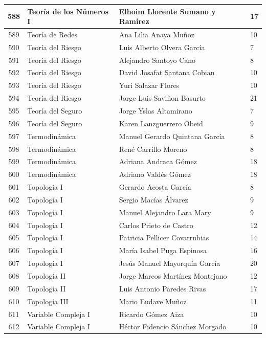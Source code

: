 {\begin{longtable}{|c|p{6.5cm}|p{5cm}|p{1.5cm}|}
  588 & Teoría de los Números I & Elhoim Llorente Sumano y Ramírez & 17 \\ \hline 
  589 & Teoría de Redes & Ana Lilia Anaya Muñoz & 10 \\ \hline 
  590 & Teoría del Riesgo & Luis Alberto Olvera García & 7 \\ \hline 
  591 & Teoría del Riesgo & Alejandro Santoyo Cano & 8 \\ \hline 
  592 & Teoría del Riesgo & David Josafat Santana Cobian & 10 \\ \hline 
  593 & Teoría del Riesgo & Yuri Salazar Flores & 10 \\ \hline 
  594 & Teoría del Riesgo & Jorge Luis Saviñon Basurto & 21 \\ \hline 
  595 & Teoría del Seguro & Jorge Yslas Altamirano & 7 \\ \hline 
  596 & Teoría del Seguro & Karen Lanzguerrero Obeid & 9 \\ \hline 
  597 & Termodinámica & Manuel Gerardo Quintana García & 8 \\ \hline 
  598 & Termodinámica & René Carrillo Moreno & 8 \\ \hline 
  599 & Termodinámica & Adriana Andraca Gómez & 18 \\ \hline 
  600 & Termodinámica & Adriano Valdés Gómez & 18 \\ \hline 
  601 & Topología I & Gerardo Acosta García & 8 \\ \hline 
  602 & Topología I & Sergio Macías Álvarez & 9 \\ \hline 
  603 & Topología I & Manuel Alejandro Lara Mary & 9 \\ \hline 
  604 & Topología I & Carlos Prieto de Castro & 12 \\ \hline 
  605 & Topología I & Patricia Pellicer Covarrubias & 14 \\ \hline 
  606 & Topología I & María Isabel Puga Espinosa & 16 \\ \hline 
  607 & Topología I & Jesús Manuel Mayorquín García & 20 \\ \hline 
  608 & Topología II & Jorge Marcos Martínez Montejano & 12 \\ \hline 
  609 & Topología II & Luis Antonio Paredes Rivas & 17 \\ \hline 
  610 & Topología III & Mario Eudave Muñoz & 11 \\ \hline 
  611 & Variable Compleja I & Ricardo Gómez Aiza & 10 \\ \hline 
  612 & Variable Compleja I & Héctor Fidencio Sánchez Morgado & 10 \\ \hline 

\end{longtable}}
